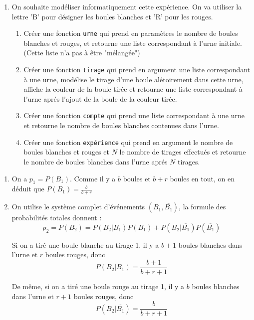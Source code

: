 \begin{exercice}
\begin{enumerate}
\item On souhaite modéliser informatiquement cette expérience. On va utiliser la lettre 'B' pour désigner les boules blanches et 'R' pour les rouges. 
\begin{enumerate}
\item Créer une fonction \texttt{urne} qui prend en paramètres le nombre de boules blanches et rouges, et retourne une liste correspondant à l'urne initiale. (Cette  liste n'a pas à être "mélangée")
\item Créer une fonction \texttt{tirage} qui prend en argument une liste correspondant à une urne, modélise le tirage d'une boule alétoirement dans cette urne, affiche la couleur de la boule tirée et retourne une liste correspondant à l'urne aprés l'ajout de la boule de la couleur tirée. 
\item Créer une fonction \texttt{compte} qui prend une liste correspondant à une urne et retourne   le nombre de  boules blanches  contenues dans l'urne. 
\item Créer une fonction \texttt{expérience} qui prend en argument le nombre de boules blanches et rouges et $N$ le nombre de tirages effectués et retourne le nombre de boules blanches dans l'urne aprés $N$ tirages. 
\end{enumerate}
 
\end{enumerate}
\begin{correction}
\begin{enumerate}


\item On a $p_1=P(B_1)$. Comme il y a $b$ boules et $b+r$ boules en tout, on en déduit que $P(B_1) =\frac{b}{b+r}$ 

\item On utilise le système complet d'événements $(B_1, \overline{B_1})$, la formule des probabilités totales donnent : 
$$p_2=P(B_2) =P(B_2|B_1) P(B_1) +P(B_2 |\overline{B_1})P(\overline{B_1})$$

Si on a tiré une boule blanche au tirage 1, il y a $b+1$ boules blanches dans l'urne et $r$ boules rouges, donc 
$$P(B_2|B_1)  =\frac{b+1}{b+r+1}$$

De même, si on a tiré une boule rouge au tirage 1, il y a $b$ boules blanches dans l'urne et $r+1$ boules rouges, donc 
$$P(B_2|\overline{B_1})  =\frac{b}{b+r+1}$$


\end{enumerate}
\end{correction}
\end{exercice}
